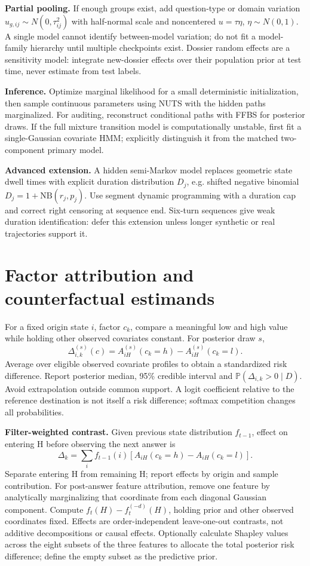 \documentclass[11pt,letterpaper]{article}
\newcommand{\Prob}{\mathbb P}
\newcommand{\sectionpage}[1]{\clearpage\section{#1}}
\begin{document}
\textbf{Partial pooling.} If enough groups exist, add question-type or domain variation $u_{g,ij}\sim N(0,\tau_{ij}^2)$ with half-normal scale and noncentered $u=\tau\eta$, $\eta\sim N(0,1)$. A single model cannot identify between-model variation; do not fit a model-family hierarchy until multiple checkpoints exist. Dossier random effects are a sensitivity model: integrate new-dossier effects over their population prior at test time, never estimate from test labels.

\textbf{Inference.} Optimize marginal likelihood for a small deterministic initialization, then sample continuous parameters using NUTS with the hidden paths marginalized. For auditing, reconstruct conditional paths with FFBS for posterior draws. If the full mixture transition model is computationally unstable, first fit a single-Gaussian covariate HMM; explicitly distinguish it from the matched two-component primary model.

\textbf{Advanced extension.} A hidden semi-Markov model replaces geometric state dwell times with explicit duration distribution $D_j$, e.g. shifted negative binomial $D_j=1+\mathrm{NB}(r_j,p_j)$. Use segment dynamic programming with a duration cap and correct right censoring at sequence end. Six-turn sequences give weak duration identification: defer this extension unless longer synthetic or real trajectories support it.

\sectionpage{Factor attribution and counterfactual estimands}
For a fixed origin state $i$, factor $c_k$, compare a meaningful low and high value while holding other observed covariates constant. For posterior draw $s$,
\[
\Delta^{(s)}_{i,k}(c)=A^{(s)}_{iH}(c_{k}=h)-A^{(s)}_{iH}(c_k=l).
\]
Average over eligible observed covariate profiles to obtain a standardized risk difference. Report posterior median, 95\% credible interval and $\Prob(\Delta_{i,k}>0\mid D)$. Avoid extrapolation outside common support. A logit coefficient relative to the reference destination is not itself a risk difference; softmax competition changes all probabilities.

\textbf{Filter-weighted contrast.} Given previous state distribution $f_{t-1}$, effect on entering H before observing the next answer is
\[
\Delta_k=\sum_i f_{t-1}(i)[A_{iH}(c_k=h)-A_{iH}(c_k=l)].
\]
Separate entering H from remaining H; report effects by origin and sample contribution. For post-answer feature attribution, remove one feature by analytically marginalizing that coordinate from each diagonal Gaussian component. Compute $f_t(H)-f_t^{(-d)}(H)$, holding prior and other observed coordinates fixed. Effects are order-independent leave-one-out contrasts, not additive decompositions or causal effects. Optionally calculate Shapley values across the eight subsets of the three features to allocate the total posterior risk difference; define the empty subset as the predictive prior. 
\end{document}
